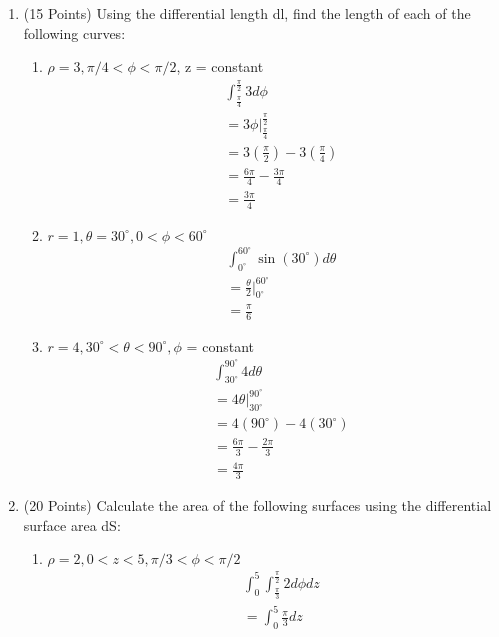 \documentclass{article}
\begin{document}
\begin{enumerate}
    \item (15 Points) Using the differential length dl, find the length of each of the following curves:
    \begin{enumerate}
        \item $\rho = 3, \pi/4 < \phi < \pi/2$, z = constant
        \begin{align}
            &\int_{\frac{\pi}{4}}^{\frac{\pi}{2}}3d\phi\\
            &=3\phi\bigg|_{\frac{\pi}{4}}^{\frac{\pi}{2}}\\
            &=3(\frac{\pi}{2}) - 3(\frac{\pi}{4})\\
            &=\frac{6\pi}{4} - \frac{3\pi}{4}\\
            &=\boxed{\frac{3\pi}{4}}
            \end{align}
        \item $r = 1, \theta = 30^\circ, 0 < \phi < 60^\circ$
        \begin{align} 
            &\int_{0^\circ}^{60^\circ}\sin(30^\circ)d\theta\\
            &=\frac{\theta}{2}\bigg|_{0^\circ}^{60^\circ}\\
            &=\boxed{\frac{\pi}{6}}
        \end{align}
        \item $r = 4, 30^\circ < \theta < 90^\circ, \phi$ = constant
        \begin{align}
            &\int_{30^\circ}^{90^\circ}4d\theta\\
            &=4\theta\bigg|_{30^\circ}^{90^\circ}\\
            &=4(90^\circ) - 4(30^\circ)\\
            &=\frac{6\pi}{3}  - \frac{2\pi}{3}\\
            &=\boxed{\frac{4\pi}{3}}
        \end{align}
    \end{enumerate}
    \newpage
    \item (20 Points) Calculate the area of the following surfaces using the differential surface area dS:
    \begin{enumerate}
        \item $\rho = 2, 0 < z <5, \pi/3 < \phi < \pi/2$
        \begin{align}
            &\int_0^5\int_{\frac{\pi}{3}}^{\frac{\pi}{2}}2d\phi dz\\
            &=\int_0^5\frac{\pi}{3}dz\\

\end{align}
\end{enumerate}
\end{enumerate}
\end{document}
